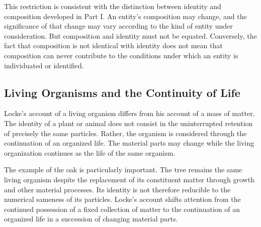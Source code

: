 \label{para:VS.B01.P01.C08.S08.SS04.P005}

This restriction is consistent with the distinction
between identity and composition developed in Part I.
An entity's composition may change, and the significance
of that change may vary according to the kind of entity
under consideration. But composition and identity
must not be equated. Conversely, the fact that
composition is not identical with identity does not
mean that composition can never contribute to the
conditions under which an entity is individuated or
identified. 



\subsection{Living Organisms and the Continuity of Life}
\label{subsec:ch08-locke-organisms}

\label{para:VS.B01.P01.C08.S08.SS05.P001}

Locke's account of a living organism differs from
his account of a mass of matter. The identity of a
plant or animal does not consist in the uninterrupted
retention of precisely the same particles. Rather,
the organism is considered through the continuation
of an organized life. The material parts may change
while the living organization continues as the life
of the same organism. \cite[II.xxvii.4--6]{LockeEssay}

\label{para:VS.B01.P01.C08.S08.SS05.P002}

The example of the oak is particularly important.
The tree remains the same living organism despite
the replacement of its constituent matter through
growth and other material processes. Its identity
is not therefore reducible to the numerical sameness
of its particles. Locke's account shifts attention
from the continued possession of a fixed collection
of matter to the continuation of an organized life
in a succession of changing material parts.
\cite[II.xxvii.4]{LockeEssay}

\label{para:VS.B01.P01.C08.S08.SS05.P003}

